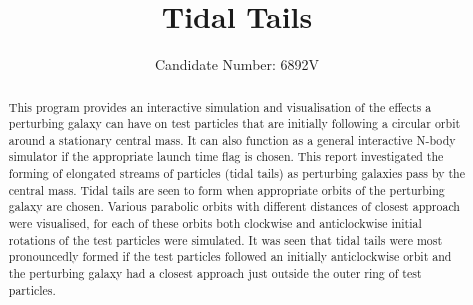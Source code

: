 \documentclass[10pt,a4paper]{article}
\begin{document}
\begin{titlingpage}
\title{Tidal Tails}
\author{Candidate Number: 6892V}
\maketitle
\begin{abstract}
This program provides an interactive simulation and visualisation of the effects a perturbing galaxy can have on test particles that are initially following a circular orbit around a stationary central mass. It can also function as a general interactive N-body simulator if the appropriate launch time flag is chosen. This report investigated the forming of elongated streams of particles (tidal tails) as perturbing galaxies pass by the central mass. Tidal tails are seen to form when appropriate orbits of the perturbing galaxy are chosen. Various parabolic orbits with different distances of closest approach were visualised, for each of these orbits both clockwise and anticlockwise initial rotations of the test particles were simulated. It was seen that tidal tails were most pronouncedly formed if the test particles followed an initially anticlockwise orbit and the perturbing galaxy had a closest approach just outside the outer ring of test particles.
\end{abstract}
	
\end{titlingpage}

\clearpage
\end{document}
